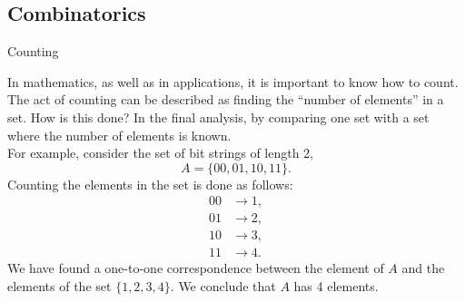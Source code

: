 \documentclass[smaller,hyperref={CJKbookmarks=true}]{beamer}
\begin{document}
\subsection{Combinatorics}
\begin{frame}[c] \begin{spacing}{2.5}
\tableofcontents[sectionstyle=hide,subsectionstyle=show/shaded/hide] \end{spacing}
\end{frame}
\begin{frame}[t]{Counting}
\begin{spacing}{0.9}
In mathematics, as well as in applications, it is important to know how to
count. The act of counting can be described as finding the ``number of
elements'' in a set. How is this done? In the final analysis, by comparing
one set with a set where the number of elements is known.\\[5pt]
For example, consider the set of bit strings of length 2,
\[A=\{00,01,10,11\}.\]
Counting the elements in the set is done as follows:
\begin{align*}
  00 &\rightarrow 1,  \\
  01 &\rightarrow 2,  \\
  10 &\rightarrow 3,  \\
  11 &\rightarrow 4.
\end{align*}
We have found a one-to-one correspondence between the element of $A$ and
the elements of the set $\{1,2,3,4\}$. We conclude that $A$ has 4 elements.
\end{spacing}
\end{frame}
\end{document}
